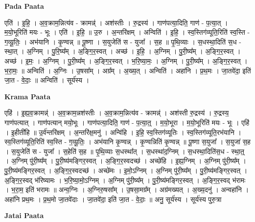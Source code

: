 \documentclass[17pt]{extarticle}
\begin{document}
\textbf{Pada Paata} \newline

एति॑ । इ॒हि॒ । अ॒व॒क्राम॒न्नित्य॑व - क्रामन्न्॑ । अश॑स्तीः । रु॒द्रस्य॑ । गाण॑पत्या॒दिति॒ गाण॑ - प॒त्या॒त् । म॒यो॒भूरिति॑ मयः - भूः । एति॑ । इ॒हि॒ ॥ उ॒रु । अ॒न्तरि॑क्षम् । अन्विति॑ । इ॒हि॒ । स्व॒स्तिग॑व्यूति॒रिति॑ स्व॒स्ति - ग॒व्यू॒तिः॒ । अभ॑यानि । कृ॒ण्वन्न् ॥ पू॒ष्णा । स॒युजेति॑ स - युजा᳚ । स॒ह ॥ पृ॒थि॒व्याः । स॒धस्था॒दिति॑ स॒ध - स्था॒त् । अ॒ग्निम् । पु॒रि॒ष्य᳚म् । अ॒ङ्गि॒र॒स्वत् । अच्छ॑ । इ॒हि॒ । अ॒ग्निम् । पु॒री॒ष्य᳚म् । अ॒ङ्गि॒र॒स्वत् । अच्छ॑ । इ॒मः॒ । अ॒ग्निम् । पु॒री॒ष्य᳚म् । अ॒ङ्गि॒र॒स्वत् । भ॒रि॒ष्या॒मः॒ । अ॒ग्निम् । पु॒री॒ष्य᳚म् । अ॒ङ्गि॒र॒स्वत् । भ॒रा॒मः॒ ॥ अन्विति॑ । अ॒ग्निः । उ॒षसा᳚म् । अग्र᳚म् । अ॒ख्य॒त् । अन्विति॑ । अहा॑नि । प्र॒थ॒मः । जा॒तवे॑दा॒ इति॑ जा॒त - वे॒दाः॒ ॥ अन्विति॑ । सूर्य॑स्य ।  \newline


\textbf{Krama Paata} \newline

एहि॑ । इ॒ह्य॒व॒क्रामन्न्॑ । अ॒व॒क्राम॒न्नश॑स्तीः । अ॒व॒क्राम॒न्नित्य॑व - क्रामन्न्॑ । अश॑स्ती रु॒द्रस्य॑ । रु॒द्रस्य॒ गाण॑पत्यात् । गाण॑पत्यान् मयो॒भूः । गाण॑पत्या॒दिति॒ गाण॑ - प॒त्या॒त्॒ । म॒यो॒भूरा । म॒यो॒भूरिति॑ मयः - भूः । एहि॑ । इ॒हीती॑हि ॥ उ॒र्व॑न्तरि॑क्षम् । अ॒न्तरि॑क्ष॒मनु॑ । अन्वि॑हि । इ॒हि॒ स्व॒स्तिग॑व्यूतिः । स्व॒स्तिग॑व्यूति॒रभ॑यानि । स्व॒स्तिग॑व्यूति॒रिति॑ स्व॒स्ति - ग॒व्यू॒तिः॒ । अभ॑यानि कृ॒ण्वन्न् । कृ॒ण्वन्निति॑ कृ॒ण्वन्न् ॥ पू॒ष्णा स॒युजा᳚ । स॒युजा॑ स॒ह । स॒युजेति॑ स - युजा᳚ । स॒हेति॑ स॒ह ॥ पृ॒थि॒व्याः स॒धस्था᳚त् । स॒धस्था॑द॒ग्निम् । स॒धस्था॒दिति॑स॒ध - स्था॒त्॒ । अ॒ग्निम् पु॑री॒ष्य᳚म् । पु॒री॒ष्य॑मङ्गिर॒स्वत् । अ॒ङ्गि॒र॒स्वदच्छ॑ । अच्छे॑हि । इ॒ह्य॒ग्निम् । अ॒ग्निम् पु॑री॒ष्य᳚म् । पु॒री॒ष्य॑मङ्गिर॒स्वत् । अ॒ङ्गि॒र॒स्वदच्छ॑ । अच्छे॑मः । इ॒मो॒ऽग्निम् । अ॒ग्निम् पु॑री॒ष्य᳚म् । पु॒री॒ष्य॑मङ्गिर॒स्वत् । अ॒ङ्गि॒र॒स्वद् भ॑रिष्यामः । भ॒रि॒ष्या॒मो॒ऽग्निम् । अ॒ग्निम् पु॑री॒ष्य᳚म् । पु॒री॒ष्य॑मङ्गिर॒स्वत् । अ॒ङ्गि॒र॒स्वद् भ॑रामः । भ॒रा॒म॒ इति॑ भरामः ॥ अन्व॒ग्निः । अ॒ग्निरु॒षसा᳚म् । उ॒षसा॒मग्र᳚म् । अग्र॑मख्यत् । अ॒ख्य॒दनु॑ । अन्वहा॑नि । अहा॑नि प्रथ॒मः । प्र॒थ॒मो जा॒तवे॑दाः । जा॒तवे॑दा॒ इति॑ जा॒त - वे॒दाः॒ ॥ अनु॒ सूर्य॑स्य । सूर्य॑स्य पुरु॒त्रा \newline

\textbf{Jatai Paata} \newline
\end{document}
